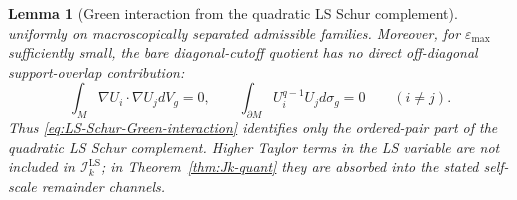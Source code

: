 \documentclass[11pt,reqno,a4paper]{amsart}
\numberwithin{equation}{section}
\theoremstyle{plain}
\newtheorem{lemma}[theorem]{Lemma}
\theoremstyle{remark}
\theoremstyle{plain}
\begin{document}
\begin{lemma}[Green interaction from the quadratic LS Schur complement]
\begin{equation}
\end{equation}
uniformly on macroscopically separated admissible families.  Moreover, for
$\varepsilon_{\max}$ sufficiently small, the bare diagonal-cutoff quotient has no
direct off-diagonal support-overlap contribution:
\begin{equation}\label{eq:bare-disjoint-no-overlap}
\int_M\nabla U_i\cdot\nabla U_jdV_g=0,
\qquad
\int_{\partial M}U_i^{q-1}U_jd\sigma_g=0
\qquad(i\ne j).
\end{equation}
Thus \eqref{eq:LS-Schur-Green-interaction} identifies only the ordered-pair part
of the \emph{quadratic} LS Schur complement.  Higher Taylor terms in the LS
variable are not included in $\mathscr I_k^{\mathrm{LS}}$; in
Theorem~\ref{thm:Jk-quant} they are absorbed into the stated self-scale remainder
channels.
\end{lemma}
\end{document}

